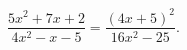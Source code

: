 \begin{ex}[type=equation]
	\begin{condition}
		$\dfrac{5x^2 + 7x + 2}{4x^2 - x - 5} = \dfrac{(4x + 5)^2}{16x^2 - 25}.$
	\end{condition}
\end{ex}